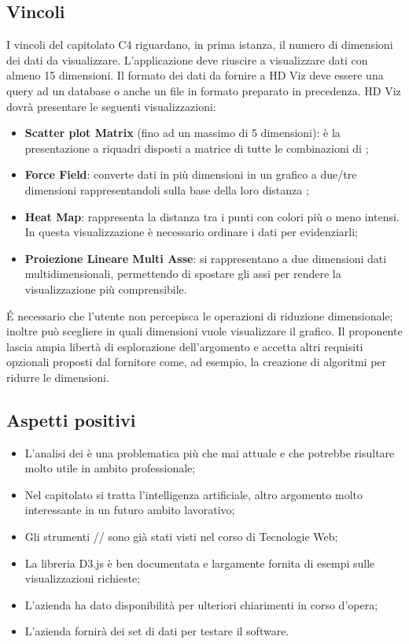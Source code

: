 \subsection{Vincoli}
I vincoli del capitolato C4 riguardano, in prima istanza, il numero di dimensioni dei dati da visualizzare. L'applicazione deve riuscire a visualizzare dati con almeno 15 dimensioni. 
Il formato dei dati da fornire a HD Viz deve essere una query ad un database o anche un file in formato  preparato in precedenza.
HD Viz dovrà presentare le seguenti visualizzazioni: 
\begin{itemize}
\item \textbf{Scatter plot Matrix} (fino ad un massimo di 5 dimensioni): è la presentazione a riquadri disposti a matrice di tutte le combinazioni di ; 
\item \textbf{Force Field}: converte dati in più dimensioni in un grafico a due/tre dimensioni rappresentandoli sulla base della loro distanza ; 
\item \textbf{Heat Map}: rappresenta la distanza tra i punti con colori più o meno intensi. In questa visualizzazione è necessario ordinare i dati per evidenziarli; 
\item \textbf{Proiezione Lineare Multi Asse}: si rappresentano a due dimensioni dati multidimensionali, permettendo di spostare gli assi per rendere la visualizzazione più comprensibile.  
\end{itemize} 
\'E necessario che l'utente non percepisca le operazioni di riduzione dimensionale; inoltre può scegliere in quali dimensioni vuole visualizzare il grafico.
Il proponente lascia ampia libertà di esplorazione dell'argomento e accetta altri requisiti opzionali proposti dal fornitore come, ad esempio, la creazione di algoritmi per ridurre le dimensioni.

\subsection{Aspetti positivi}
\begin{itemize}
\item L'analisi dei  è una problematica più che mai attuale e che potrebbe risultare molto utile in ambito professionale;
\item Nel capitolato si tratta l'intelligenza artificiale, altro argomento molto interessante in un futuro ambito lavorativo;
\item Gli strumenti // sono già stati visti nel corso di Tecnologie Web;
\item La libreria D3.js è ben documentata e largamente fornita di esempi sulle visualizzazioni richieste;
\item L'azienda ha dato disponibilità per ulteriori chiarimenti in corso d'opera;
\item L'azienda fornirà dei set di dati per testare il software.
\end{itemize}

